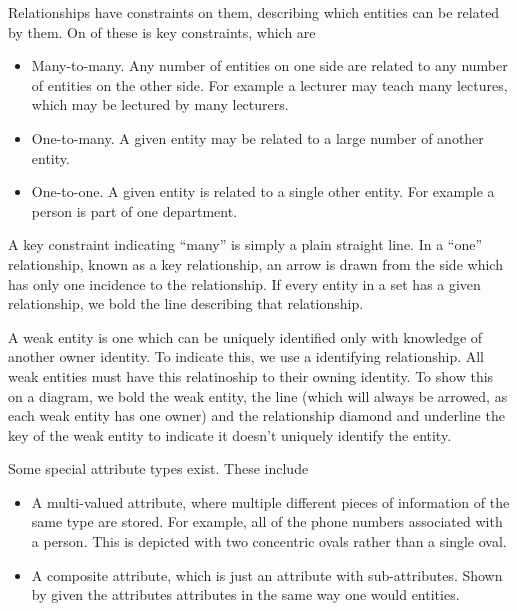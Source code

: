 \documentclass[12pt]{report}
\begin{document}
\begin{flushleft}
Relationships have constraints on them, describing which entities can be
related by them. On of these is key constraints, which are
\begin{itemize}
    \item Many-to-many. Any number of entities on one side are related to any
        number of entities on the other side. For example a lecturer may teach
        many lectures, which may be lectured by many lecturers.
    \item One-to-many. A given entity may be related to a large number of
        another entity.
    \item One-to-one. A given entity is related to a single other entity. For
        example a person is part of one department.
\end{itemize}
A key constraint indicating ``many'' is simply a plain straight line. In a
``one'' relationship, known as a key relationship, an arrow is drawn from the
side which has only one incidence to the relationship. If every entity in a set
has a given relationship, we bold the line describing that relationship. \par
A weak entity is one which can be uniquely identified only with knowledge of
another owner identity. To indicate this, we use a identifying relationship. All
weak entities must have this relatinoship to their owning identity. To show this
on a diagram, we bold the weak entity, the line (which will always be arrowed,
as each weak entity has one owner) and the relationship diamond and underline
the key of the weak entity to indicate it doesn't uniquely identify the entity.
\par
Some special attribute types exist. These include
\begin{itemize}
    \item A multi-valued attribute, where multiple different pieces of
        information of the same type are stored. For example, all of the phone
        numbers associated with a person. This is depicted with two concentric
        ovals rather than a single oval.
    \item A composite attribute, which is just an attribute with sub-attributes.
        Shown by given the attributes attributes in the same way one would
        entities.
\end{itemize}


\end{flushleft}
\end{document}
